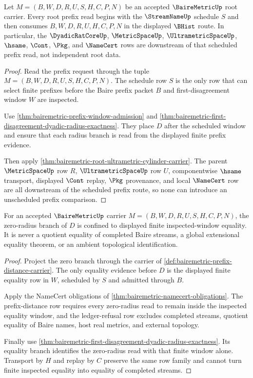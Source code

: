 \begin{theorem}
\label{thm:bairemetric-root-streamname-prefix-route}
Let $M=(B,W,D,R,U,S,H,C,P,N)$ be an accepted $\BaireMetricUp$ root carrier. Every root prefix read begins with the $\StreamNameUp$ schedule $S$ and then consumes $B,W,D,R,U,H,C,P,N$ in the displayed $\BHist$ route. In particular, the $\DyadicRatCoreUp$, $\MetricSpaceUp$, $\UltrametricSpaceUp$, $\hsame$, $\Cont$, $\Pkg$, and $\NameCert$ rows are downstream of that scheduled prefix read, not independent root data.
\end{theorem}
\begin{proof}
Read the prefix request through the tuple $M=(B,W,D,R,U,S,H,C,P,N)$. The schedule row $S$ is the only row that can select finite prefixes before the Baire prefix packet $B$ and first-disagreement window $W$ are inspected.

Use \autoref{thm:bairemetric-prefix-window-admission} and \autoref{thm:bairemetric-first-disagreement-dyadic-radius-exactness}. They place $D$ after the scheduled window and ensure that each radius branch is read from the displayed finite prefix evidence.

Then apply \autoref{thm:bairemetric-root-ultrametric-cylinder-carrier}. The parent $\MetricSpaceUp$ row $R$, $\UltrametricSpaceUp$ row $U$, componentwise $\hsame$ transport, displayed $\Cont$ replay, $\Pkg$ provenance, and local $\NameCert$ row are all downstream of the scheduled prefix route, so none can introduce an unscheduled prefix comparison.
\end{proof}

\begin{theorem}
\label{thm:bairemetric-zero-radius-branch}
For an accepted $\BaireMetricUp$ carrier $M=(B,W,D,R,U,S,H,C,P,N)$, the zero-radius branch of $D$ is confined to displayed finite inspected-window equality. It is never a quotient equality of completed Baire streams, a global extensional equality theorem, or an ambient topological identification.
\end{theorem}
\begin{proof}
Project the zero branch through the carrier of \autoref{def:bairemetric-prefix-distance-carrier}. The only equality evidence before $D$ is the displayed finite equality row in $W$, scheduled by $S$ and admitted through $B$.

Apply the NameCert obligations of \autoref{thm:bairemetric-namecert-obligations}. The prefix-distance row requires every zero-radius read to remain inside the inspected equality window, and the ledger-refusal row excludes completed streams, quotient equality of Baire names, host real metrics, and external topology.

Finally use \autoref{thm:bairemetric-first-disagreement-dyadic-radius-exactness}. Its equality branch identifies the zero-radius read with that finite window alone. Transport by $H$ and replay by $C$ preserve the same row family and cannot turn finite inspected equality into equality of completed streams.
\end{proof}

